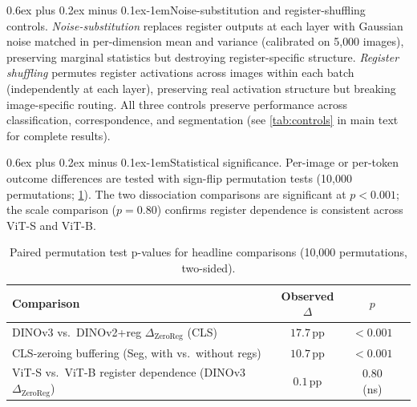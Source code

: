 \documentclass[10pt,twocolumn,letterpaper]{article}
\makeatletter
\renewcommand{\paragraph}{\@startsection{paragraph}{4}{\z@}%
  {0.6ex plus 0.2ex minus 0.1ex}{-1em}{\normalfont\normalsize\bfseries}}
\makeatother
\begin{document}
\paragraph{Noise-substitution and register-shuffling controls.}
\label{sec:supp_noise_shuffle}
\emph{Noise-substitution} replaces register outputs at each layer with Gaussian noise matched in per-dimension mean and variance (calibrated on 5{,}000 images), preserving marginal statistics but destroying register-specific structure.
\emph{Register shuffling} permutes register activations across images within each batch (independently at each layer), preserving real activation structure but breaking image-specific routing.
All three controls preserve performance across classification, correspondence, and segmentation (see \cref{tab:controls} in main text for complete results).

\paragraph{Statistical significance.}
\label{sec:supp_pvalues}
Per-image or per-token outcome differences are tested with sign-flip permutation tests (10{,}000 permutations; \cref{tab:pvalues}).
The two dissociation comparisons are significant at $p < 0.001$; the scale comparison ($p = 0.80$) confirms register dependence is consistent across ViT-S and ViT-B.

\begin{table}[t]
\centering
\caption{Paired permutation test p-values for headline comparisons
(10{,}000 permutations, two-sided).}
\label{tab:pvalues}
\scriptsize
\setlength{\tabcolsep}{3pt}
\begin{tabular}{@{}p{5.5cm}ccc@{}}
\toprule
\textbf{Comparison} & \textbf{Observed $\Delta$} & \textbf{$p$} \\
\midrule
DINOv3 vs.\ DINOv2+reg $\Delta_\text{ZeroReg}$ (CLS) &
  $17.7$\,pp & $< 0.001$ \\
CLS-zeroing buffering (Seg, with vs.\ without regs) &
  $10.7$\,pp & $< 0.001$ \\
ViT-S vs.\ ViT-B register dependence (DINOv3 $\Delta_\text{ZeroReg}$) &
  $0.1$\,pp & $0.80$ (ns) \\
\bottomrule
\end{tabular}
\end{table}

\end{document}
